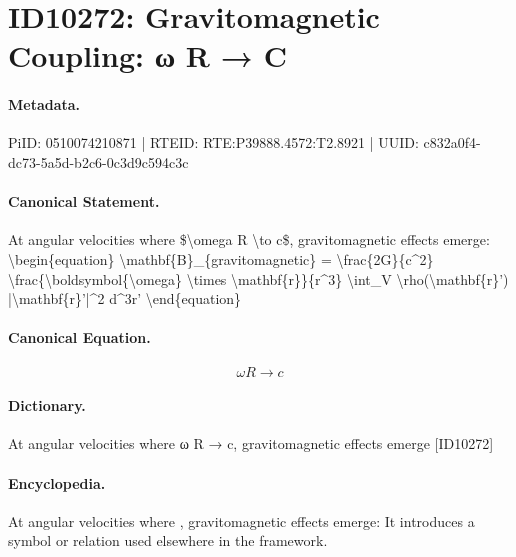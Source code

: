 \section*{ID10272: Gravitomagnetic Coupling: ω R → C}
\paragraph{Metadata.}
PiID: 0510074210871 | RTEID: RTE:P39888.4572:T2.8921 | UUID: c832a0f4-dc73-5a5d-b2c6-0c3d9c594c3c

\paragraph{Canonical Statement.}
At angular velocities where \$\textbackslash{}omega R \textbackslash{}to c\$, gravitomagnetic effects emerge: \textbackslash{}begin\{equation\} \textbackslash{}mathbf\{B\}\_\{gravitomagnetic\} = \textbackslash{}frac\{2G\}\{c\textasciicircum{}2\} \textbackslash{}frac\{\textbackslash{}boldsymbol\{\textbackslash{}omega\} \textbackslash{}times \textbackslash{}mathbf\{r\}\}\{r\textasciicircum{}3\} \textbackslash{}int\_V \textbackslash{}rho(\textbackslash{}mathbf\{r\}') |\textbackslash{}mathbf\{r\}'|\textasciicircum{}2 d\textasciicircum{}3r' \textbackslash{}end\{equation\}

\paragraph{Canonical Equation.}
\[
\omega R \to c
\]

\paragraph{Dictionary.}
At angular velocities where ω R → c, gravitomagnetic effects emerge [ID10272]

\paragraph{Encyclopedia.}
At angular velocities where , gravitomagnetic effects emerge: It introduces a symbol or relation used elsewhere in the framework.
